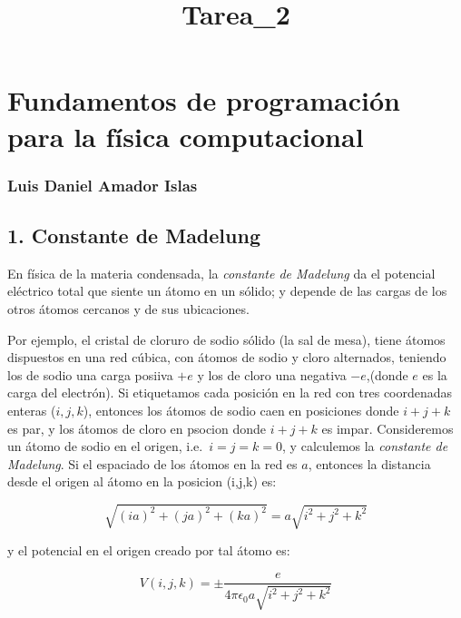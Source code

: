 \documentclass[11pt]{article}
\title{Tarea\_2}
\begin{document}
    
    \maketitle
    
    

    
    \hypertarget{fundamentos-de-programaciuxf3n-para-la-fuxedsica-computacional}{%
\section{Fundamentos de programación para la física
computacional}\label{fundamentos-de-programaciuxf3n-para-la-fuxedsica-computacional}}

\hypertarget{luis-daniel-amador-islas}{%
\subsubsection{Luis Daniel Amador
Islas}\label{luis-daniel-amador-islas}}

    \hypertarget{constante-de-madelung}{%
\subsection{1. Constante de Madelung}\label{constante-de-madelung}}

En física de la materia condensada, la \emph{constante de Madelung} da
el potencial eléctrico total que siente un átomo en un sólido; y depende
de las cargas de los otros átomos cercanos y de sus ubicaciones.

Por ejemplo, el cristal de cloruro de sodio sólido (la sal de mesa),
tiene átomos dispuestos en una red cúbica, con átomos de sodio y cloro
alternados, teniendo los de sodio una carga posiiva \(+e\) y los de
cloro una negativa \(-e\),(donde \(e\) es la carga del electrón). Si
etiquetamos cada posición en la red con tres coordenadas enteras
(\(i,j,k\)), entonces los átomos de sodio caen en posiciones donde
\(i+j+k\) es par, y los átomos de cloro en psocion donde \(i+j+k\) es
impar. Consideremos un átomo de sodio en el origen, i.e.~\(i=j=k=0\), y
calculemos la \emph{constante de Madelung}. Si el espaciado de los
átomos en la red es \(a\), entonces la distancia desde el origen al
átomo en la posicion (i,j,k) es:

\[
\sqrt{(ia)^2 + (ja)^2 + (ka)^2} = a\sqrt{i^2 + j^2 + k^2}
\]

y el potencial en el origen creado por tal átomo es:

\[
V(i,j,k) = ±\frac{e}{4 \pi \epsilon_0a \sqrt{i^2 + j^2 + k^2}}
\]
\end{document}

